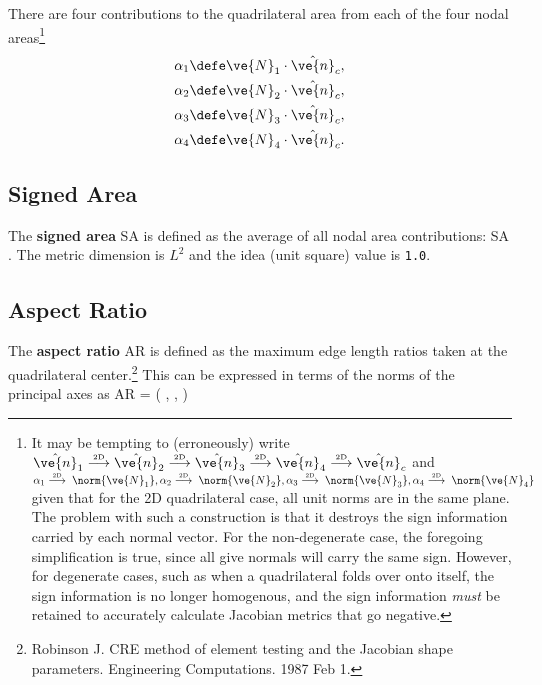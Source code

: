 \documentclass[14pt,letterpaper,fleqn]{extreport}
\begin{document}
There are four contributions to the quadrilateral area from each of the four nodal areas\footnote{\label{footnote:admonishment} It may be tempting to (erroneously) write
 $\hat{\ve{n}}_1 
 \overset{\tiny \mbox{2D}}{\longrightarrow}
 \hat{\ve{n}}_2 
 \overset{\tiny \mbox{2D}}{\longrightarrow}
 \hat{\ve{n}}_3 
 \overset{\tiny \mbox{2D}}{\longrightarrow}
 \hat{\ve{n}}_4
 \overset{\tiny \mbox{2D}}{\longrightarrow}
 \hat{\ve{n}}_c$
and
 $\alpha_1  \overset{\tiny \mbox{2D}}{\longrightarrow} \; \norm{\ve{N}_1}, 
 \alpha_2  \overset{\tiny \mbox{2D}}{\longrightarrow} \; \norm{\ve{N}_2},
 \alpha_3  \overset{\tiny \mbox{2D}}{\longrightarrow} \; \norm{\ve{N}_3},
 \alpha_4  \overset{\tiny \mbox{2D}}{\longrightarrow} \; \norm{\ve{N}_4}$
 given that for the 2D quadrilateral case, all unit norms are in the same plane.
 The problem with such a construction is that it destroys the sign information 
 carried by each normal vector.  
 For the non-degenerate case, the foregoing simplification is true, since all give normals
 will carry the same sign.  However, for degenerate cases, such as when a quadrilateral
 folds over onto itself, 
 the sign information is no longer homogenous, and the sign information
 {\em must} be retained to accurately calculate Jacobian metrics that go negative.
}
\begin{align}
 \alpha_1 & \defe \ve{N}_1 \cdot \hat{\ve{n}}_c, \\
 \alpha_2 & \defe \ve{N}_2 \cdot \hat{\ve{n}}_c, \\
 \alpha_3 & \defe \ve{N}_3 \cdot \hat{\ve{n}}_c, \\
 \alpha_4 & \defe \ve{N}_4 \cdot \hat{\ve{n}}_c.
\end{align}
%

\subsection{Signed Area}
The {\bf signed area} SA is defined as the average of all nodal area contributions:
\be 
\mbox{SA}  \; .
\ee
The metric dimension is $L^2$ and the idea (unit square) value is {\tt 1.0}.

\subsection{Aspect Ratio}

The {\bf aspect ratio} AR is defined as the maximum edge length ratios taken at the 
quadrilateral center.\footnote{Robinson J. CRE method 
of element testing and the Jacobian shape parameters. Engineering Computations. 
1987 Feb 1.}  
This can be expressed in terms of the norms of the principal axes as
\be 
\mbox{AR} = \max\left(
  \frac{\norm{\vX}}{\norm{\vY}}, 
  \frac{\norm{\vY}}{\norm{\vX}}, 
 \right)
\ee
\end{document}
